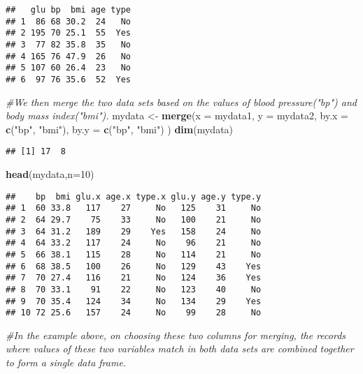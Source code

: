 \documentclass[]{book}
\newenvironment{Shaded}{\begin{snugshade}}{\end{snugshade}}
\newcommand{\KeywordTok}[1]{\textcolor[rgb]{0.13,0.29,0.53}{\textbf{#1}}}
\newcommand{\DataTypeTok}[1]{\textcolor[rgb]{0.13,0.29,0.53}{#1}}
\newcommand{\DecValTok}[1]{\textcolor[rgb]{0.00,0.00,0.81}{#1}}
\newcommand{\StringTok}[1]{\textcolor[rgb]{0.31,0.60,0.02}{#1}}
\newcommand{\CommentTok}[1]{\textcolor[rgb]{0.56,0.35,0.01}{\textit{#1}}}
\newcommand{\NormalTok}[1]{#1}
\theoremstyle{definition}
\theoremstyle{definition}
\theoremstyle{definition}
\theoremstyle{remark}
\begin{document}
\begin{verbatim}
##   glu bp  bmi age type
## 1  86 68 30.2  24   No
## 2 195 70 25.1  55  Yes
## 3  77 82 35.8  35   No
## 4 165 76 47.9  26   No
## 5 107 60 26.4  23   No
## 6  97 76 35.6  52  Yes
\end{verbatim}

\begin{Shaded}
\begin{Highlighting}[]
\CommentTok{#We then merge the two data sets based on the values of blood pressure("bp") and body mass index("bmi").}
\NormalTok{mydata <-}\StringTok{ }\KeywordTok{merge}\NormalTok{(}\DataTypeTok{x =}\NormalTok{ mydata1, }\DataTypeTok{y =}\NormalTok{ mydata2,}
   \DataTypeTok{by.x =} \KeywordTok{c}\NormalTok{(}\StringTok{"bp"}\NormalTok{, }\StringTok{"bmi"}\NormalTok{),}
   \DataTypeTok{by.y =} \KeywordTok{c}\NormalTok{(}\StringTok{"bp"}\NormalTok{, }\StringTok{"bmi"}\NormalTok{)}
\NormalTok{)}
\KeywordTok{dim}\NormalTok{(mydata)}
\end{Highlighting}
\end{Shaded}

\begin{verbatim}
## [1] 17  8
\end{verbatim}

\begin{Shaded}
\begin{Highlighting}[]
\KeywordTok{head}\NormalTok{(mydata,}\DataTypeTok{n=}\DecValTok{10}\NormalTok{)}
\end{Highlighting}
\end{Shaded}

\begin{verbatim}
##    bp  bmi glu.x age.x type.x glu.y age.y type.y
## 1  60 33.8   117    27     No   125    31     No
## 2  64 29.7    75    33     No   100    21     No
## 3  64 31.2   189    29    Yes   158    24     No
## 4  64 33.2   117    24     No    96    21     No
## 5  66 38.1   115    28     No   114    21     No
## 6  68 38.5   100    26     No   129    43    Yes
## 7  70 27.4   116    21     No   124    36    Yes
## 8  70 33.1    91    22     No   123    40     No
## 9  70 35.4   124    34     No   134    29    Yes
## 10 72 25.6   157    24     No    99    28     No
\end{verbatim}

\begin{Shaded}
\begin{Highlighting}[]
\CommentTok{#In the example above, on choosing these two columns for merging, the records where values of these two variables match in both data sets are combined together to form a single data frame.}
\end{Highlighting}
\end{Shaded}
\end{document}
